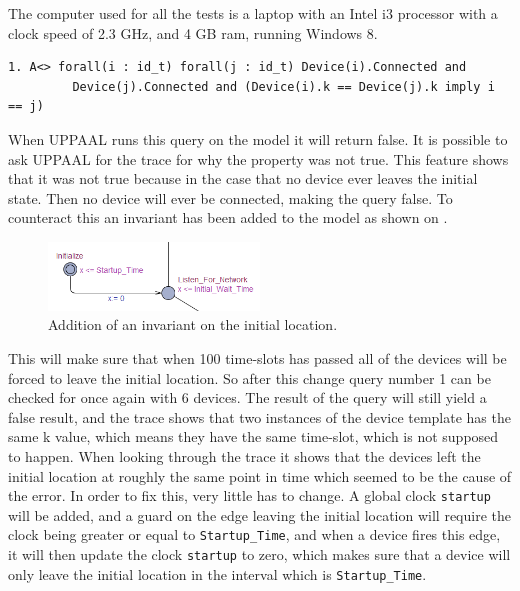 The computer used for all the tests is a laptop with an Intel i3 processor with a clock speed of 2.3 GHz, and 4 GB ram, running Windows 8.

\noindent\begin{minipage}{\textwidth}
\begin{lstlisting}[style=UPPAAL, title={This query requires that eventually if all devices are connected, then no pair of devices have the same \texttt{k}, unless the pair consists of the same two devices.}]
1. A<> forall(i : id_t) forall(j : id_t) Device(i).Connected and
         Device(j).Connected and (Device(i).k == Device(j).k imply i == j)
\end{lstlisting}
\end{minipage}

When UPPAAL runs this query on the model it will return false.
It is possible to ask UPPAAL for the trace for why the property was not true.
This feature shows that it was not true because in the case that no device ever leaves the initial state. 
Then no device will ever be connected, making the query false.
To counteract this an invariant has been added to the model as shown on .

\begin{figure}
  \includegraphics[width=0.5\textwidth]{Figures/Model/InvariantOnStartup.png} 
\caption{Addition of an invariant on the initial location.}
\label{UPPAALInvariant}
\end{figure}

This will make sure that when 100 time-slots has passed all of the devices will be forced to leave the initial location.
So after this change query number 1 can be checked for once again with 6 devices.
The result of the query will still yield a false result, and the trace shows that two instances of the device template has the same k value, which means they have the same time-slot, which is not supposed to happen.
When looking through the trace it shows that the devices left the initial location at roughly the same point in time which seemed to be the cause of the error.
In order to fix this, very little has to change.
A global clock \texttt{startup} will be added, and a guard on the edge leaving the initial location will require the clock being greater or equal to \texttt{Startup\_Time}, and when a device fires this edge, it will then update the clock \texttt{startup} to zero, which makes sure that a device will only leave the initial location in the interval which is \texttt{Startup\_Time}.

